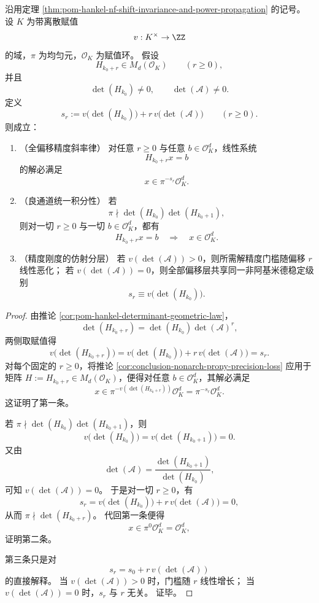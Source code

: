 \begin{theorem}\label{thm:conclusion-hankel-shift-padic-precision-slope}
沿用定理 \ref{thm:pom-hankel-nf-shift-invariance-and-power-propagation} 的记号。
设 \(K\) 为带离散赋值
\[
v:K^\times\to\ZZ
\]
的域，\(\pi\) 为均匀元，\(\mathcal O_K\) 为赋值环。
假设
\[
H_{k_0+r}\in M_d(\mathcal O_K)\qquad(r\ge 0),
\]
并且
\[
\det(H_{k_0})\neq 0,\qquad \det(\mathcal A)\neq 0.
\]
定义
\[
s_r:=v\!\bigl(\det(H_{k_0})\bigr)+r\,v\!\bigl(\det(\mathcal A)\bigr)\qquad(r\ge 0).
\]
则成立：
\begin{enumerate}
  \item \textup{（全偏移精度斜率律）}
  对任意 \(r\ge 0\) 与任意 \(b\in \mathcal O_K^d\)，线性系统
  \[
  H_{k_0+r}x=b
  \]
  的解必满足
  \[
  x\in \pi^{-s_r}\mathcal O_K^d.
  \]
  \item \textup{（良通道统一积分性）}
  若
  \[
  \pi\nmid \det(H_{k_0})\det(H_{k_0+1}),
  \]
  则对一切 \(r\ge 0\) 与一切 \(b\in \mathcal O_K^d\)，都有
  \[
  H_{k_0+r}x=b
  \quad\Longrightarrow\quad
  x\in \mathcal O_K^d.
  \]
  \item \textup{（精度刚度的仿射分层）}
  若 \(v(\det(\mathcal A))>0\)，则所需解精度门槛随偏移 \(r\) 线性恶化；
  若 \(v(\det(\mathcal A))=0\)，则全部偏移层共享同一非阿基米德稳定级别
  \[
  s_r\equiv v\!\bigl(\det(H_{k_0})\bigr).
  \]
\end{enumerate}
\end{theorem}
\begin{proof}
由推论 \ref{cor:pom-hankel-determinant-geometric-law}，
\[
\det(H_{k_0+r})=\det(H_{k_0})\det(\mathcal A)^r,
\]
两侧取赋值得
\[
v\!\bigl(\det(H_{k_0+r})\bigr)
=
v\!\bigl(\det(H_{k_0})\bigr)+r\,v\!\bigl(\det(\mathcal A)\bigr)
=
s_r.
\]
对每个固定的 \(r\ge 0\)，将推论 \ref{cor:conclusion-nonarch-prony-precision-loss} 应用于矩阵 \(H:=H_{k_0+r}\in M_d(\mathcal O_K)\)，便得对任意 \(b\in\mathcal O_K^d\)，其解必满足
\[
x\in \pi^{-v(\det(H_{k_0+r}))}\mathcal O_K^d
=
\pi^{-s_r}\mathcal O_K^d.
\]
这证明了第一条。

若 \(\pi\nmid \det(H_{k_0})\det(H_{k_0+1})\)，则
\[
v\!\bigl(\det(H_{k_0})\bigr)=v\!\bigl(\det(H_{k_0+1})\bigr)=0.
\]
又由
\[
\det(\mathcal A)=\frac{\det(H_{k_0+1})}{\det(H_{k_0})},
\]
可知 \(v(\det(\mathcal A))=0\)。
于是对一切 \(r\ge 0\)，有
\[
s_r
=
v\!\bigl(\det(H_{k_0})\bigr)+r\,v\!\bigl(\det(\mathcal A)\bigr)
=0,
\]
从而 \(\pi\nmid \det(H_{k_0+r})\)。
代回第一条便得
\[
x\in \pi^{0}\mathcal O_K^d=\mathcal O_K^d,
\]
证明第二条。

第三条只是对
\[
s_r=s_0+r\,v(\det(\mathcal A))
\]
的直接解释。
当 \(v(\det(\mathcal A))>0\) 时，门槛随 \(r\) 线性增长；
当 \(v(\det(\mathcal A))=0\) 时，\(s_r\) 与 \(r\) 无关。
证毕。
\end{proof}

\endinput

